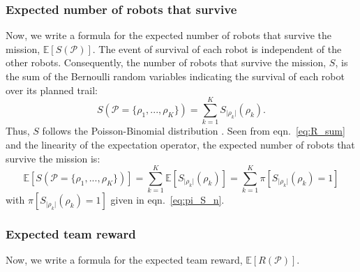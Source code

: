 \documentclass[11pt, oneside]{article}
\begin{document}
\subsubsection{Expected number of robots that survive}
Now, we write a formula for the expected number of robots that survive the mission, $\mathbb{E}[S(\mathcal{P})]$. The event of survival of each robot is independent of the other robots.
Consequently, the number of robots that survive the mission, $S$, is the sum of the Bernoulli random variables indicating the survival of each robot over its planned trail:
\begin{equation}
	S(\mathcal{P}=\{\rho_1, ..., \rho_K\})=\sum_{k=1}^K S_{\lvert \rho_k \rvert}(\rho_k). \label{eq:R_sum}
\end{equation}
Thus, $S$ follows the Poisson-Binomial distribution \cite{tang2023poisson}.
Seen from eqn.~\ref{eq:R_sum} and the linearity of the expectation operator, the expected number of robots that survive the mission is:
\begin{equation}
	\mathbb{E}[S(\mathcal{P}=\{\rho_1, ..., \rho_K\})]=\sum_{k=1}^K \mathbb{E}[S_{\lvert \rho_k \rvert}(\rho_k)] = \sum_{k=1}^K  \pi[S_{\lvert \rho_k \rvert}(\rho_k) = 1] \label{eq:formula_obj2}
\end{equation} with $\pi[S_{\lvert \rho_k \rvert}(\rho_k) = 1]$ given in eqn.~\ref{eq:pi_S_n}.



\subsubsection{Expected team reward}
Now, we write a formula for the expected team reward, $\mathbb{E}[R(\mathcal{P})]$. 
\end{document}
